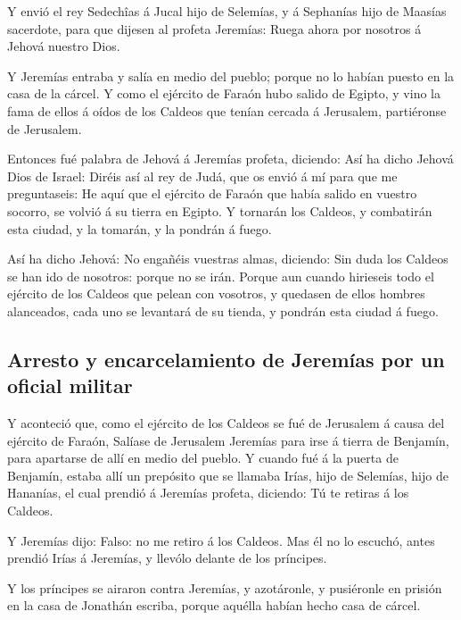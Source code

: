  Y envió el rey Sedechîas á Jucal hijo de Selemías, y á
Sephanías hijo de Maasías sacerdote, para que dijesen al profeta
Jeremías: Ruega ahora por nosotros á Jehová nuestro Dios.

 Y Jeremías entraba y salía en medio del pueblo; porque no
lo habían puesto en la casa de la cárcel.  Y como el
ejército de Faraón hubo salido de Egipto, y vino la fama de ellos á
oídos de los Caldeos que tenían cercada á Jerusalem, partiéronse de
Jerusalem.

 Entonces fué palabra de Jehová á Jeremías profeta,
diciendo:  Así ha dicho Jehová Dios de Israel: Diréis así
al rey de Judá, que os envió á mí para que me preguntaseis: He aquí que
el ejército de Faraón que había salido en vuestro socorro, se volvió á
su tierra en Egipto.  Y tornarán los Caldeos, y combatirán
esta ciudad, y la tomarán, y la pondrán á fuego.

 Así ha dicho Jehová: No engañéis vuestras almas,
diciendo: Sin duda los Caldeos se han ido de nosotros: porque no se
irán.  Porque aun cuando hirieseis todo el ejército de
los Caldeos que pelean con vosotros, y quedasen de ellos hombres
alanceados, cada uno se levantará de su tienda, y pondrán esta ciudad á
fuego.

\hypertarget{arresto-y-encarcelamiento-de-jeremuxedas-por-un-oficial-militar}{%
\subsection{Arresto y encarcelamiento de Jeremías por un oficial
militar}\label{arresto-y-encarcelamiento-de-jeremuxedas-por-un-oficial-militar}}

 Y aconteció que, como el ejército de los Caldeos se fué
de Jerusalem á causa del ejército de Faraón,  Salíase de
Jerusalem Jeremías para irse á tierra de Benjamín, para apartarse de
allí en medio del pueblo.  Y cuando fué á la puerta de
Benjamín, estaba allí un prepósito que se llamaba Irías, hijo de
Selemías, hijo de Hananías, el cual prendió á Jeremías profeta,
diciendo: Tú te retiras á los Caldeos.

 Y Jeremías dijo: Falso: no me retiro á los Caldeos. Mas
él no lo escuchó, antes prendió Irías á Jeremías, y llevólo delante de
los príncipes.

 Y los príncipes se airaron contra Jeremías, y
azotáronle, y pusiéronle en prisión en la casa de Jonathán escriba,
porque aquélla habían hecho casa de cárcel.


